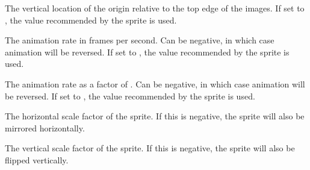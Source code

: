 \documentclass[letterpaper,10pt,english]{sphinxmanual}
\begin{document}
\begin{fulllineitems}
\begin{fulllineitems}
\end{fulllineitems}


\begin{fulllineitems}
\label{dsp:sge.dsp.Object.image_origin_y}
The vertical location of the origin relative to the top edge of
the images.  If set to , the value recommended by
the sprite is used.

\end{fulllineitems}


\begin{fulllineitems}
\label{dsp:sge.dsp.Object.image_fps}
The animation rate in frames per second.  Can be negative, in
which case animation will be reversed.  If set to ,
the value recommended by the sprite is used.

\end{fulllineitems}


\begin{fulllineitems}
\label{dsp:sge.dsp.Object.image_speed}
The animation rate as a factor of .  Can be
negative, in which case animation will be reversed.  If set to
, the value recommended by the sprite is used.

\end{fulllineitems}


\begin{fulllineitems}
\label{dsp:sge.dsp.Object.image_xscale}
The horizontal scale factor of the sprite.  If this is negative,
the sprite will also be mirrored horizontally.

\end{fulllineitems}


\begin{fulllineitems}
\label{dsp:sge.dsp.Object.image_yscale}
The vertical scale factor of the sprite.  If this is negative,
the sprite will also be flipped vertically.


\end{fulllineitems}
\end{fulllineitems}
\end{document}
